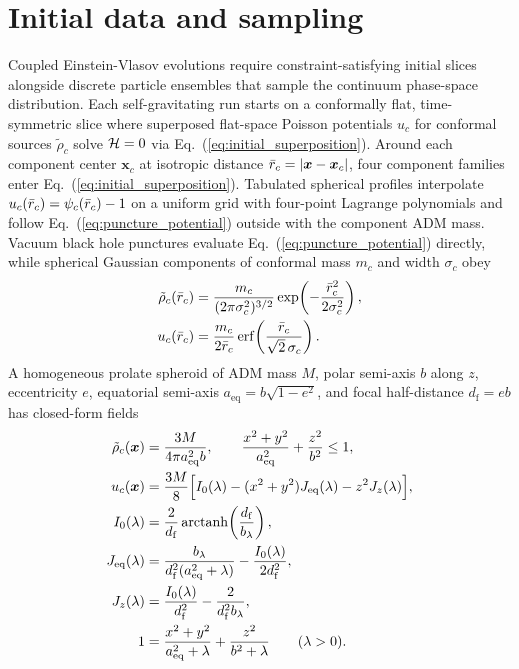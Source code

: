 \section{Initial data and sampling}\label{app:sampling}

Coupled Einstein-Vlasov evolutions require constraint-satisfying initial slices alongside discrete particle ensembles that sample the continuum phase-space distribution. Each self-gravitating run starts on a conformally flat, time-symmetric slice where superposed flat-space Poisson potentials $u_c$ for conformal sources $\tilde{\rho}_c$ solve $\mathcal{H}=0$ via Eq.~(\ref{eq:initial_superposition}). Around each component center $\bm{x}_c$ at isotropic distance $\bar{r}_c=|\bm{x}-\bm{x}_c|$, four component families enter Eq.~(\ref{eq:initial_superposition}). Tabulated spherical profiles interpolate $u_c(\bar{r}_c)=\psi_c(\bar{r}_c)-1$ on a uniform grid with four-point Lagrange polynomials and follow Eq.~(\ref{eq:puncture_potential}) outside with the component ADM mass. Vacuum black hole punctures evaluate Eq.~(\ref{eq:puncture_potential}) directly, while spherical Gaussian components of conformal mass $m_c$ and width $\sigma_c$ obey
\begin{align}\label{eq:app_gaussian}
\tilde{\rho}_c(\bar{r}_c)&=\frac{m_c}{(2\pi\sigma_c^2)^{3/2}}\exp\!\left(-\frac{\bar{r}_c^2}{2\sigma_c^2}\right),\nonumber\\
u_c(\bar{r}_c)&=\frac{m_c}{2\bar{r}_c}\,\mathrm{erf}\!\left(\frac{\bar{r}_c}{\sqrt{2}\,\sigma_c}\right).
\end{align}
A homogeneous prolate spheroid of ADM mass $M$, polar semi-axis $b$ along $z$, eccentricity $e$, equatorial semi-axis $a_{\mathrm{eq}}=b\sqrt{1-e^2}$, and focal half-distance $d_{\mathrm{f}}=eb$ has closed-form fields \cite{Shapiro:1991zza,Yoo:2016kzu}
\begin{align}\label{eq:app_spheroid}
\tilde{\rho}_c(\bm{x})&=\frac{3M}{4\pi a_{\mathrm{eq}}^2b},\qquad\frac{x^2+y^2}{a_{\mathrm{eq}}^2}+\frac{z^2}{b^2}\le1,\nonumber\\
u_c(\bm{x})&=\frac{3M}{8}\Bigl[I_0(\lambda)-(x^2+y^2)J_{\mathrm{eq}}(\lambda)-z^2J_z(\lambda)\Bigr],\nonumber\\
I_0(\lambda)&=\frac{2}{d_{\mathrm{f}}}\,\mathrm{arctanh}\!\left(\frac{d_{\mathrm{f}}}{b_\lambda}\right),\nonumber\\
J_{\mathrm{eq}}(\lambda)&=\frac{b_\lambda}{d_{\mathrm{f}}^2(a_{\mathrm{eq}}^2+\lambda)}-\frac{I_0(\lambda)}{2d_{\mathrm{f}}^2},\nonumber\\
J_z(\lambda)&=\frac{I_0(\lambda)}{d_{\mathrm{f}}^2}-\frac{2}{d_{\mathrm{f}}^2b_\lambda},\nonumber\\
1&=\frac{x^2+y^2}{a_{\mathrm{eq}}^2+\lambda}+\frac{z^2}{b^2+\lambda}\qquad(\lambda>0).
\end{align}
